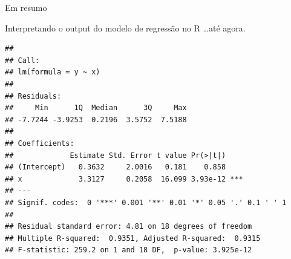 \documentclass{beamer}\usepackage[]{graphicx}\usepackage[]{color}
\makeatletter
\newenvironment{kframe}{%
 \def\at@end@of@kframe{}%
 \ifinner\ifhmode%
  \def\at@end@of@kframe{\end{minipage}}%
  \begin{minipage}{\columnwidth}%
 \fi\fi%
 \def\FrameCommand##1{\hskip\@totalleftmargin \hskip-\fboxsep
 \colorbox{shadecolor}{##1}\hskip-\fboxsep
     \hskip-\linewidth \hskip-\@totalleftmargin \hskip\columnwidth}%
 \MakeFramed {\advance\hsize-\width
   \@totalleftmargin\z@ \linewidth\hsize
   \@setminipage}}%
 {\par\unskip\endMakeFramed%
 \at@end@of@kframe}
\newenvironment{knitrout}{}{} %
\renewenvironment{knitrout}{\setlength{\topsep}{0mm}}{}
\makeatother
\begin{document}
\begin{frame}{Em resumo}


\end{frame}


\begin{frame}[fragile]

Interpretando o output do modelo de regressão no R \dots até agora.

\begin{knitrout}\tiny
{}\color{fgcolor}\begin{kframe}
\begin{verbatim}
## 
## Call:
## lm(formula = y ~ x)
## 
## Residuals:
##     Min      1Q  Median      3Q     Max 
## -7.7244 -3.9253  0.2196  3.5752  7.5188 
## 
## Coefficients:
##             Estimate Std. Error t value Pr(>|t|)    
## (Intercept)   0.3632     2.0016   0.181    0.858    
## x             3.3127     0.2058  16.099 3.93e-12 ***
## ---
## Signif. codes:  0 '***' 0.001 '**' 0.01 '*' 0.05 '.' 0.1 ' ' 1
## 
## Residual standard error: 4.81 on 18 degrees of freedom
## Multiple R-squared:  0.9351,	Adjusted R-squared:  0.9315 
## F-statistic: 259.2 on 1 and 18 DF,  p-value: 3.925e-12
\end{verbatim}
\end{kframe}
\end{knitrout}

\end{frame}
\end{document}
